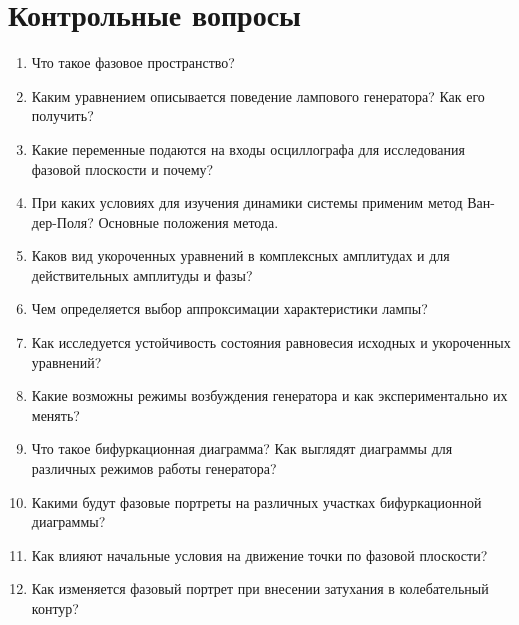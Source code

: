 \section{Контрольные вопросы}

\begin{enumerate}
	\item Что такое фазовое пространство?
	\item Каким уравнением описывается поведение лампового генератора? Как его получить?
	\item Какие переменные подаются на входы осциллографа для исследования фазовой плоскости и почему?
	\item При каких условиях для изучения динамики системы применим метод Ван-дер-Поля? Основные положения метода.
	\item Каков вид укороченных уравнений в комплексных амплитудах и для действительных амплитуды и фазы?
	\item Чем определяется выбор аппроксимации характеристики лампы?
	\item Как исследуется устойчивость состояния равновесия исходных и укороченных уравнений?
	\item Какие возможны режимы возбуждения генератора и как экспериментально их менять?
	\item Что такое бифуркационная диаграмма? Как выглядят диаграммы для различных режимов работы генератора?
	\item Какими будут фазовые портреты на различных участках бифуркационной диаграммы?
	\item Как влияют начальные условия на движение точки по фазовой плоскости?
	\item Как изменяется фазовый портрет при внесении затухания в колебательный контур?
\end{enumerate}
